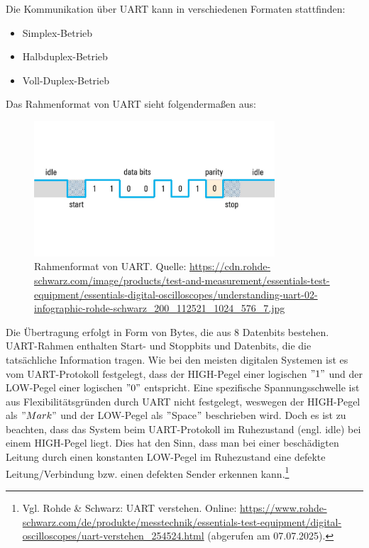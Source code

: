 Die Kommunikation über UART kann in verschiedenen Formaten stattfinden:
\begin{itemize}
    \item Simplex-Betrieb
    \item Halbduplex-Betrieb
    \item Voll-Duplex-Betrieb
\end{itemize}
Das Rahmenformat von UART sieht folgendermaßen aus:
\begin{figure}[H]
    \centering
    \includegraphics[width=0.8\textwidth]{Pictures/UART-Frame.jpg}
    \caption{Rahmenformat von UART. Quelle: \url{https://cdn.rohde-schwarz.com/image/products/test-and-measurement/essentials-test-equipment/essentials-digital-oscilloscopes/understanding-uart-02-infographic-rohde-schwarz_200_112521_1024_576_7.jpg}}
    \label{fig:UART-Frame}
\end{figure}
\clearpage
Die Übertragung erfolgt in Form von Bytes, die aus 8 Datenbits bestehen. UART-Rahmen enthalten Start- und Stoppbits und Datenbits, die die tatsächliche Information tragen. Wie bei den meisten digitalen Systemen ist es vom UART-Protokoll festgelegt, dass der HIGH-Pegel einer logischen $"1"$ und der LOW-Pegel einer logischen $"0"$ entspricht. Eine spezifische Spannungsschwelle ist aus Flexibilitätsgründen durch UART nicht festgelegt, weswegen der HIGH-Pegel als $"Mark"$ und der LOW-Pegel als $"$Space$"$ beschrieben wird. Doch es ist zu beachten, dass das System beim UART-Protokoll im Ruhezustand (engl. idle) bei einem HIGH-Pegel liegt. Dies hat den Sinn, dass man bei einer beschädigten Leitung durch einen konstanten LOW-Pegel im Ruhezustand eine defekte Leitung/Verbindung bzw. einen defekten Sender erkennen kann.\footnote{Vgl. Rohde \& Schwarz: UART verstehen. Online: \url{https://www.rohde-schwarz.com/de/produkte/messtechnik/essentials-test-equipment/digital-oscilloscopes/uart-verstehen_254524.html} (abgerufen am 07.07.2025).}

